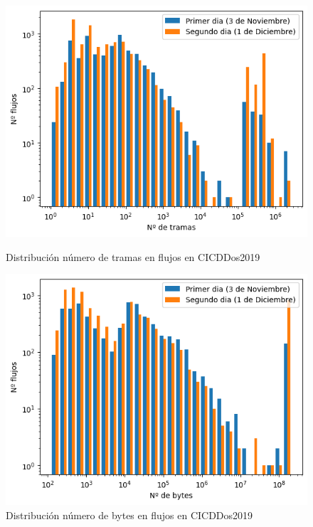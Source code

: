 \begin{figure}[H]
      \includegraphics[width=\linewidth]{media/cicddos_2019_pcap_frames_distribution.png}
      \captionsetup{justification=centering}
      \caption{Distribución número de tramas en flujos en CICDDos2019}\label{fig:cicddos_2019_pcap_frames_distribution}
    \endminipage\hfill
      \includegraphics[width=\linewidth]{media/cicddos_2019_pcap_bytes_distribution.png}
      \captionsetup{justification=centering}
      \caption{Distribución número de bytes en flujos en CICDDos2019}\label{fig:cicddos_2019_pcap_bytes_distribution}
    \endminipage\hfill
\end{figure}

